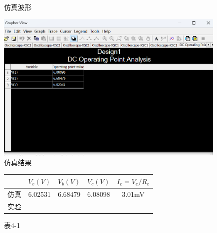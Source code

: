 \documentclass[a4paper,10pt,notitlepage]{article}
\begin{document}
\begin{figure}[h]
\begin{minipage}{0.28\textwidth}
			\caption*{仿真波形}
		\end{minipage}
		\qquad
		\begin{minipage}{0.28\textwidth}
			\centering
			\includegraphics[width=\textwidth]{3.png}
			\caption*{仿真结果}
		\end{minipage}
	\end{figure}
	\begin{figure}[h]
		\centering
			\begin{tabular}{|c|c|c|c|c|}
			\hline
			& $V_e(V)$ & $V_b(V)$ & $V_c(V)$ & $I_c=V_e/R_e$ \\
			\hline
			仿真 & 6.02531 & 6.68479 & 6.08098 & 3.01mV \\
			\hline
			实验 & \quad & \quad & \qquad & \quad  \\
			\hline
		\end{tabular}
		\caption*{表4-1 }
	\end{figure}
	\newpage
\end{document}
